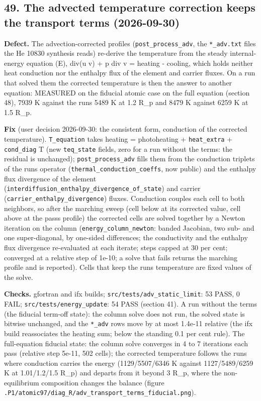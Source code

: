 \documentclass[english,a4paper]{my_memo}
\begin{document}
\subsection{49. The advected temperature correction keeps the transport terms (2026-09-30)}\label{49-the-advected-temperature-correction-keeps-the-transport-terms-2026-09-30}

\textbf{Defect.} The advection-corrected profiles (\texttt{post\_process\_adv}, the
\texttt{*\_adv.txt} files the He 10830 synthesis reads) re-derive the temperature
from the steady internal-energy equation (E), div(u v) + p div v = heating -
cooling, which holds neither heat conduction nor the enthalpy flux of the
element and carrier fluxes. On a run that solved them the corrected
temperature is then the answer to another equation: MEASURED on the
fiducial atomic case on the full equation (section 48), 7939 K against the
run\textquotesingle s 5489 K at 1.2 R\_p and 8479 K against 6259 K at 1.5 R\_p.

\textbf{Fix} (user decision 2026-09-30: the consistent form, conduction of the
corrected temperature). \texttt{T\_equation} takes heating = photoheating +
\texttt{heat\_extra} + \texttt{cond\_diag} T (new \texttt{teq\_state} fields, zero for a run without
the terms: the residual is unchanged); \texttt{post\_process\_adv} fills them from
the conduction triplets of the run\textquotesingle s operator (\texttt{thermal\_conduction\_coeffs},
now public) and the enthalpy flux divergence of the element
(\texttt{interdiffusion\_enthalpy\_divergence\_of\_state}) and carrier
(\texttt{carrier\_enthalpy\_divergence}) fluxes. Conduction couples each cell to both
neighbors, so after the marching sweep (cell below at its corrected value,
cell above at the pass\textquotesingle s profile) the corrected cells are solved together
by a Newton iteration on the column (\texttt{energy\_column\_newton}: banded
Jacobian, two sub- and one super-diagonal, by one-sided differences; the
conductivity and the enthalpy flux divergence re-evaluated at each iterate;
steps capped at 30 per cent; converged at a relative step of 1e-10; a solve
that fails returns the marching profile and is reported). Cells that keep
the run\textquotesingle s temperature are fixed values of the solve.

\textbf{Checks.} gfortran and ifx builds; \texttt{src/tests/adv\_static\_limit}: 53
PASS, 0 FAIL; \texttt{src/tests/energy\_update}: 54 PASS (section 41). A run without
the terms (the fiducial term-off state): the column solve does not run, the
solved state is bitwise unchanged, and the \texttt{*\_adv} rows move by at most
1.4e-11 relative (the ifx build reassociates the heating sum; below the
standing 0.1 per cent rule). The full-equation fiducial state: the column
solve converges in 4 to 7 iterations each pass (relative step 5e-11, 502
cells); the corrected temperature follows the run\textquotesingle s where conduction
carries the energy (1129/5507/6346 K against 1127/5489/6259 K at
1.01/1.2/1.5 R\_p) and departs from it beyond 3 R\_p, where the
non-equilibrium composition changes the balance (figure
\texttt{.P1/atomic97/diag\_R/adv\_transport\_terms\_fiducial.png}).
\end{document}
